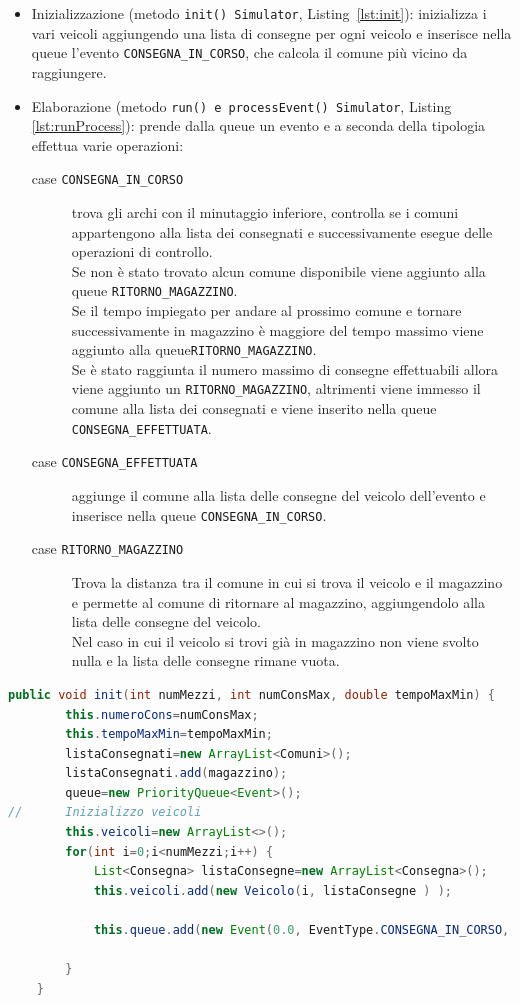 \documentclass[a4paper,12pt]{report}
\begin{document}
\begin{itemize}
	\item Inizializzazione (metodo \texttt{init() Simulator}, Listing~\ref{lst:init}): inizializza i vari veicoli aggiungendo una
lista di consegne per ogni veicolo e inserisce nella queue l'evento \texttt{CONSEGNA\_IN\_CORSO}, che calcola il comune più vicino da raggiungere.
	\item Elaborazione (metodo \texttt{run() e processEvent() Simulator}, Listing \ref{lst:runProcess}): prende dalla queue un evento e a seconda della tipologia effettua varie operazioni:
	
	\begin{description}
	
	\item[case \texttt{CONSEGNA\_IN\_CORSO}] trova gli archi con il minutaggio inferiore, controlla se i comuni appartengono alla lista dei consegnati e successivamente esegue delle operazioni di controllo.\\
Se non è stato trovato alcun comune disponibile viene aggiunto alla queue \texttt{RITORNO\_MAGAZZINO}.\\
Se il tempo impiegato per andare al prossimo comune e tornare successivamente in magazzino è maggiore
del tempo massimo viene aggiunto alla queue\texttt{RITORNO\_MAGAZZINO}.\\
Se è stato raggiunta il numero massimo di consegne effettuabili allora viene aggiunto un \texttt{RITORNO\_MAGAZZINO},
altrimenti viene immesso il comune alla lista dei consegnati e viene inserito nella queue \texttt{CONSEGNA\_EFFETTUATA}.
	\item[case \texttt{CONSEGNA\_EFFETTUATA}] aggiunge il comune alla lista delle consegne del veicolo dell'evento
e inserisce nella queue \texttt{CONSEGNA\_IN\_CORSO}.
	\item[case \texttt{RITORNO\_MAGAZZINO}] Trova la distanza tra il comune in cui si trova il veicolo e il magazzino e permette al comune di ritornare al magazzino, aggiungendolo alla lista delle consegne del veicolo.\\
Nel caso in cui il veicolo si trovi già in magazzino non viene svolto nulla e la lista delle consegne
rimane vuota.
	\end{description}
\end{itemize}
\begin{center}
\begin{lstlisting}[caption={Metodo init() della classe Simulator},  label={lst:init},captionpos=b, language=Java]
		public void init(int numMezzi, int numConsMax, double tempoMaxMin) {
		this.numeroCons=numConsMax;
		this.tempoMaxMin=tempoMaxMin;
		listaConsegnati=new ArrayList<Comuni>();
		listaConsegnati.add(magazzino);
		queue=new PriorityQueue<Event>();
//		Inizializzo veicoli
		this.veicoli=new ArrayList<>();
		for(int i=0;i<numMezzi;i++) {
			List<Consegna> listaConsegne=new ArrayList<Consegna>();
			this.veicoli.add(new Veicolo(i, listaConsegne ) );

			this.queue.add(new Event(0.0, EventType.CONSEGNA_IN_CORSO, this.veicoli.get(i), magazzino) );
			
		}
	}
\end{lstlisting}
\end{center}
\end{document}
